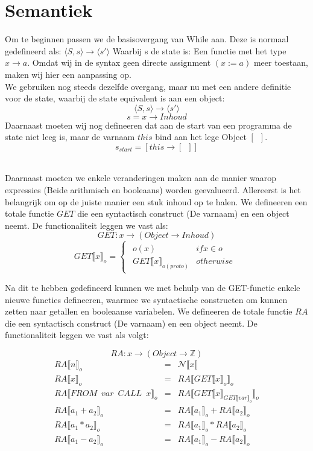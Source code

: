 \documentclass[12pt]{article}
\begin{document}
\section{Semantiek}
Om te beginnen passen we de basisovergang van While aan. Deze is normaal gedefineerd als:
$ \langle S,s \rangle \rightarrow \langle s\prime \rangle $
Waarbij s de state is: Een functie met het type
$ x \rightarrow a $.
Omdat wij in de syntax geen directe assignment $(x := a)$ meer toestaan, maken wij hier een aanpassing op.\\
We gebruiken nog steeds dezelfde overgang, maar nu met een andere definitie voor de state, waarbij de state equivalent is aan een object:
\[ \langle S,s \rangle \rightarrow \langle s\prime \rangle \]
\[ s = x \rightarrow Inhoud \]
Daarnaast moeten wij nog defineeren dat aan de start van een programma de state niet leeg is, maar de varnaam $ this $ bind aan het lege Object $ [\enspace] $.
\[ s_{start} = [this \rightarrow [\enspace]]\]
\\
\par
Daarnaast moeten we enkele veranderingen maken aan de manier waarop expressies (Beide arithmisch en booleaans) worden geevalueerd. Allereerst is het belangrijk om op de juiste manier een stuk inhoud op te halen. We defineeren een totale functie $ GET $ die een syntactisch construct (De varnaam) en een object neemt. De functionaliteit leggen we vast als:
\[ GET: x \rightarrow (Object \rightarrow Inhoud) \]
\[
GET\llbracket x \rrbracket_o =
\begin{cases}
\begin{matrix}
o(x) & if x \in o\\
GET\llbracket x \rrbracket_{o(proto)} & otherwise
\end{matrix}
\end{cases}
\]

Na dit te hebben gedefineerd kunnen we met behulp van de GET-functie enkele nieuwe functies defineeren, waarmee we syntactische constructen om kunnen zetten naar getallen en booleaanse variabelen. We defineeren de totale functie $ RA $ die een syntactisch construct (De varnaam) en een object neemt. De functionaliteit leggen we vast als volgt:

\[ RA: x \rightarrow (Object \rightarrow \mathds{Z} ) \]
\[
\begin{matrix}
RA\llbracket n \rrbracket_o & = & \mathcal{N}\llbracket x \rrbracket\\
RA\llbracket x \rrbracket_o & = & RA\llbracket GET\llbracket x \rrbracket_o \rrbracket_o\\
RA\llbracket FROM \enspace var \enspace CALL \enspace x \rrbracket_o & = & RA\llbracket GET\llbracket x \rrbracket_{GET\llbracket var \rrbracket_o} \rrbracket_o\\
RA\llbracket a_1 + a_2 \rrbracket_o & = & RA\llbracket a_1 \rrbracket_o + RA\llbracket a_2 \rrbracket_o\\
RA\llbracket a_1 * a_2 \rrbracket_o & = & RA\llbracket a_1 \rrbracket_o * RA\llbracket a_2 \rrbracket_o\\
RA\llbracket a_1 - a_2 \rrbracket_o & = & RA\llbracket a_1 \rrbracket_o - RA\llbracket a_2 \rrbracket_o\\
\end{matrix}
\]
\end{document}

